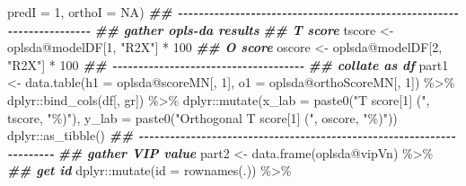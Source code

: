 \documentclass[
]{article}
\newenvironment{Shaded}{\begin{snugshade}}{\end{snugshade}}
\newcommand{\AttributeTok}[1]{\textcolor[rgb]{0.77,0.63,0.00}{#1}}
\newcommand{\ConstantTok}[1]{\textcolor[rgb]{0.00,0.00,0.00}{#1}}
\newcommand{\DecValTok}[1]{\textcolor[rgb]{0.00,0.00,0.81}{#1}}
\newcommand{\DocumentationTok}[1]{\textcolor[rgb]{0.56,0.35,0.01}{\textbf{\textit{#1}}}}
\newcommand{\FunctionTok}[1]{\textcolor[rgb]{0.00,0.00,0.00}{#1}}
\newcommand{\NormalTok}[1]{#1}
\newcommand{\OtherTok}[1]{\textcolor[rgb]{0.56,0.35,0.01}{#1}}
\newcommand{\SpecialCharTok}[1]{\textcolor[rgb]{0.00,0.00,0.00}{#1}}
\newcommand{\StringTok}[1]{\textcolor[rgb]{0.31,0.60,0.02}{#1}}
\begin{document}
\begin{Shaded}
\begin{Highlighting}[]
                          \AttributeTok{predI =} \DecValTok{1}\NormalTok{, }\AttributeTok{orthoI =} \ConstantTok{NA}\NormalTok{)}
    \DocumentationTok{\#\# {-}{-}{-}{-}{-}{-}{-}{-}{-}{-}{-}{-}{-}{-}{-}{-}{-}{-}{-}{-}{-}{-}{-}{-}{-}{-}{-}{-}{-}{-}{-}{-}{-}{-}{-}{-}{-}{-}{-}{-}{-}{-}{-}{-}{-}{-}{-}{-}{-}{-}{-}{-}{-}{-}{-}{-}{-}{-}{-}{-}{-}{-}{-}{-}{-}{-}{-}{-}{-}{-} }
    \DocumentationTok{\#\# gather opls{-}da results}
    \DocumentationTok{\#\# T score}
\NormalTok{    tscore }\OtherTok{\textless{}{-}}\NormalTok{ oplsda}\SpecialCharTok{@}\NormalTok{modelDF[}\DecValTok{1}\NormalTok{, }\StringTok{"R2X"}\NormalTok{] }\SpecialCharTok{*} \DecValTok{100}
    \DocumentationTok{\#\# O score}
\NormalTok{    oscore }\OtherTok{\textless{}{-}}\NormalTok{ oplsda}\SpecialCharTok{@}\NormalTok{modelDF[}\DecValTok{2}\NormalTok{, }\StringTok{"R2X"}\NormalTok{] }\SpecialCharTok{*} \DecValTok{100}
    \DocumentationTok{\#\# {-}{-}{-}{-}{-}{-}{-}{-}{-}{-}{-}{-}{-}{-}{-}{-}{-}{-}{-}{-}{-}{-}{-}{-}{-}{-}{-}{-}{-}{-}{-}{-}{-}{-}{-}{-}{-} }
    \DocumentationTok{\#\# collate as df}
\NormalTok{    part1 }\OtherTok{\textless{}{-}} \FunctionTok{data.table}\NormalTok{(}\AttributeTok{h1 =}\NormalTok{ oplsda}\SpecialCharTok{@}\NormalTok{scoreMN[, }\DecValTok{1}\NormalTok{], }\AttributeTok{o1 =}\NormalTok{ oplsda}\SpecialCharTok{@}\NormalTok{orthoScoreMN[, }\DecValTok{1}\NormalTok{]) }\SpecialCharTok{\%\textgreater{}\%}
\NormalTok{      dplyr}\SpecialCharTok{::}\FunctionTok{bind\_cols}\NormalTok{(df[, gr]) }\SpecialCharTok{\%\textgreater{}\%}
\NormalTok{      dplyr}\SpecialCharTok{::}\FunctionTok{mutate}\NormalTok{(}\AttributeTok{x\_lab =} \FunctionTok{paste0}\NormalTok{(}\StringTok{"T score[1] ("}\NormalTok{, tscore, }\StringTok{"\%)"}\NormalTok{),}
                    \AttributeTok{y\_lab =} \FunctionTok{paste0}\NormalTok{(}\StringTok{"Orthogonal T score[1] ("}\NormalTok{, oscore, }\StringTok{"\%)"}\NormalTok{))}
\NormalTok{      dplyr}\SpecialCharTok{::}\FunctionTok{as\_tibble}\NormalTok{()}
    \DocumentationTok{\#\# {-}{-}{-}{-}{-}{-}{-}{-}{-}{-}{-}{-}{-}{-}{-}{-}{-}{-}{-}{-}{-}{-}{-}{-}{-}{-}{-}{-}{-}{-}{-}{-}{-}{-}{-}{-}{-}{-}{-}{-}{-}{-}{-}{-}{-}{-}{-}{-}{-}{-}{-}{-}{-}{-}{-}{-}{-}{-}{-}{-}{-}{-}{-}{-}{-}{-}{-}{-}{-}{-} }
    \DocumentationTok{\#\# gather VIP value}
\NormalTok{    part2 }\OtherTok{\textless{}{-}} \FunctionTok{data.frame}\NormalTok{(oplsda}\SpecialCharTok{@}\NormalTok{vipVn) }\SpecialCharTok{\%\textgreater{}\%}
      \DocumentationTok{\#\# get id}
\NormalTok{      dplyr}\SpecialCharTok{::}\FunctionTok{mutate}\NormalTok{(}\AttributeTok{id =} \FunctionTok{rownames}\NormalTok{(.)) }\SpecialCharTok{\%\textgreater{}\%}

\end{Highlighting}
\end{Shaded}
\end{document}

